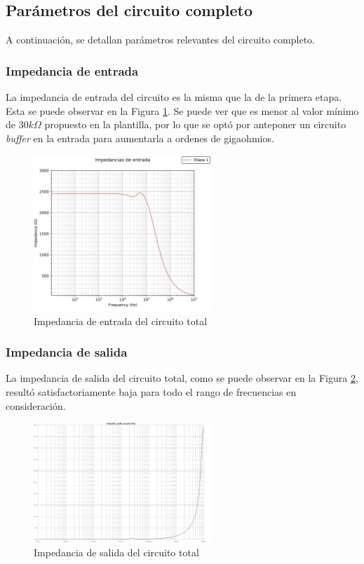 \documentclass[spanish]{article}
\begin{document}
\subsection{Parámetros del circuito completo}
A continuación, se detallan parámetros relevantes del circuito completo.
\subsubsection{Impedancia de entrada}
La impedancia de entrada del circuito es la misma que la de la primera etapa. Esta se puede observar en la Figura \ref{impentetapa1}. Se puede ver que es menor al valor mínimo de $30k\Omega$ propuesto en la plantilla, por lo que se optó por anteponer un circuito \emph{buffer} en la entrada para aumentarla a ordenes de gigaohmios.

\begin{figure}[H]
    \centering
    \includegraphics[width=0.6\textwidth]{Resources/impentetapa1.png}
    \caption{Impedancia de entrada del circuito total}
    \label{impentetapa1}
\end{figure}

\subsubsection{Impedancia de salida}
La impedancia de salida del circuito total, como se puede observar en la Figura \ref{impsaltotal}, resultó satisfactoriamente baja para todo el rango de frecuencias en consideración.

\begin{figure}[H]
    \centering
    \includegraphics[width=0.6\textwidth]{Resources/impsaltotal.png}
    \caption{Impedancia de salida del circuito total}
    \label{impsaltotal}
\end{figure}
\end{document}
